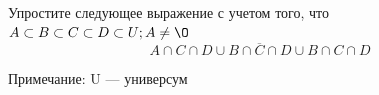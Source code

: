 \question
Упростите следующее выражение с учетом того, что $A\subset B \subset C \subset D \subset U; A \neq \O$
\begin{equation*}
A \cap C  \cap D \cup B \cap \overline{C} \cap D \cup B \cap C \cap D
\end{equation*}

Примечание: U — универсум